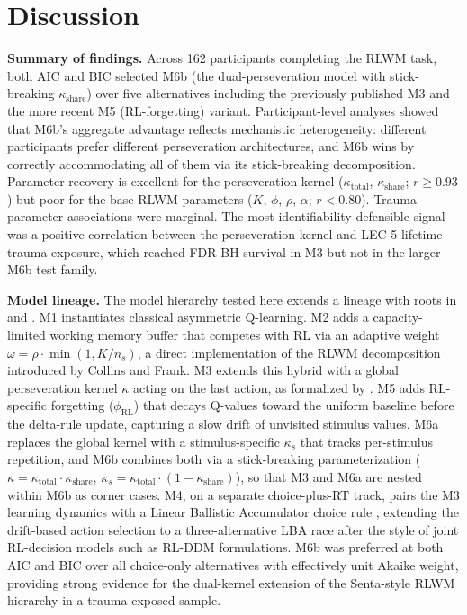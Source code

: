 \documentclass{article}
\begin{document}
\section{Discussion}\label{sec-discussion}

\textbf{Summary of findings.} Across 162 participants completing the
RLWM task, both AIC and BIC selected M6b (the dual-perseveration model
with stick-breaking \(\kappa_{\text{share}}\)) over five alternatives
including the previously published M3 and the more recent M5
(RL-forgetting) variant. Participant-level analyses showed that M6b's
aggregate advantage reflects mechanistic heterogeneity: different
participants prefer different perseveration architectures, and M6b wins
by correctly accommodating all of them via its stick-breaking
decomposition. Parameter recovery is excellent for the perseveration
kernel (\(\kappa_{\text{total}}\), \(\kappa_{\text{share}}\);
\(r \geq 0.93\)) but poor for the base RLWM parameters (\(K\), \(\phi\),
\(\rho\), \(\alpha\); \(r < 0.80\)). Trauma-parameter associations were
marginal. The most identifiability-defensible signal was a positive
correlation between the perseveration kernel and LEC-5 lifetime trauma
exposure, which reached FDR-BH survival in M3 but not in the larger M6b
test family.

\textbf{Model lineage.} The model hierarchy tested here extends a
lineage with roots in \citet{collins2012how} and
\citet{collins2014working}. M1 instantiates classical asymmetric
Q-learning. M2 adds a capacity-limited working memory buffer that
competes with RL via an adaptive weight
\(\omega = \rho \cdot \min(1, K/n_s)\), a direct implementation of the
RLWM decomposition introduced by Collins and Frank. M3 extends this
hybrid with a global perseveration kernel \(\kappa\) acting on the last
action, as formalized by \citet{senta2025}. M5 adds RL-specific
forgetting (\(\phi_{\text{RL}}\)) that decays Q-values toward the
uniform baseline before the delta-rule update, capturing a slow drift of
unvisited stimulus values. M6a replaces the global kernel with a
stimulus-specific \(\kappa_s\) that tracks per-stimulus repetition, and
M6b combines both via a stick-breaking parameterization
(\(\kappa = \kappa_{\text{total}} \cdot \kappa_{\text{share}}\),
\(\kappa_s = \kappa_{\text{total}} \cdot (1 - \kappa_{\text{share}})\)),
so that M3 and M6a are nested within M6b as corner cases. M4, on a
separate choice-plus-RT track, pairs the M3 learning dynamics with a
Linear Ballistic Accumulator choice rule \citep{senta2025}, extending
the \citet{senta2025} drift-based action selection to a
three-alternative LBA race after the style of joint RL-decision models
such as RL-DDM formulations. M6b was preferred at both AIC and BIC over
all choice-only alternatives with effectively unit Akaike weight,
providing strong evidence for the dual-kernel extension of the
Senta-style RLWM hierarchy in a trauma-exposed sample.
\end{document}
